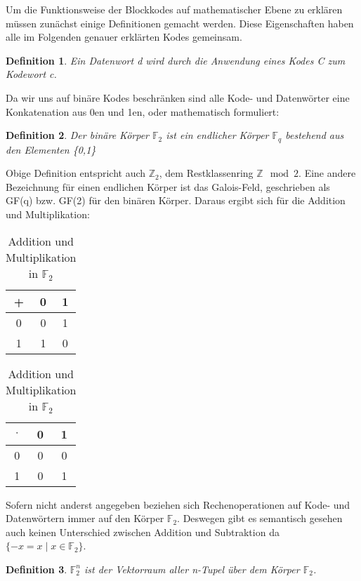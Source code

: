 

Um die Funktionsweise der Blockkodes auf mathematischer Ebene zu erklären müssen zunächst einige Definitionen gemacht werden. Diese Eigenschaften haben alle im Folgenden genauer erklärten Kodes gemeinsam.\newline
\newtheorem{t_def}{Definition}[chapter]
\begin{t_def}
Ein {\em Datenwort d} wird durch die Anwendung eines {\em Kodes C} zum {\em Kodewort c}.
\end{t_def}

Da wir uns auf binäre Kodes beschränken sind alle Kode- und Datenwörter eine Konkatenation aus 0en und 1en, oder mathematisch formuliert:

\begin{t_def}
Der binäre Körper $\mathbb{F}_{2}$ ist ein endlicher Körper $\mathbb{F}_{q}$ bestehend aus den Elementen \{0,1\}
\end{t_def}

Obige Definition entspricht auch $\mathbb{Z}_2$, dem Restklassenring $\mathbb{Z}\mod 2$. Eine andere Bezeichnung für einen endlichen Körper ist das Galois-Feld, geschrieben als GF(q) bzw. GF(2) für den binären Körper. Daraus ergibt sich für die Addition und Multiplikation:
\begin{table}[!h]
\begin{center}
\begin{tabular}{c|c|c}
+ & 0 & 1 \\
\hline
0 & 0 & 1 \\
\hline
1 & 1 & 0 \\
\end{tabular}
\begin{tabular}{c|c|c}
$\cdot$ & 0 & 1 \\
\hline
0 & 0 & 0 \\
\hline
1 & 0 & 1 \\
\end{tabular}
\caption{Addition und Multiplikation in $\mathbb{F}_2$}
\label{table:addmul}
\end{center}
\end{table}

Sofern nicht anderst angegeben beziehen sich Rechenoperationen auf Kode- und Datenwörtern immer auf den Körper $\mathbb{F}_2$. Deswegen gibt es semantisch gesehen auch keinen Unterschied zwischen Addition und Subtraktion da $\{-x = x \mid x \in \mathbb{F}_2\}$.\cite[Kap. 1.1]{huffman2010fundamentals}

\begin{t_def}
$\mathbb{F}_{2}^{n}$ ist der Vektorraum aller {\em n-Tupel} über dem Körper $\mathbb{F}_2$.
\end{t_def}

